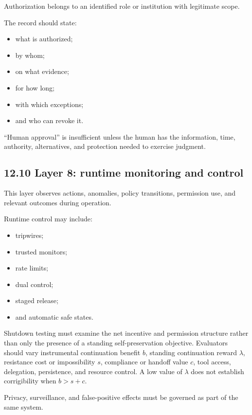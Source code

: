 \documentclass[
  11pt,
]{article}
\providecommand{\tightlist}{%
  \setlength{\itemsep}{0pt}\setlength{\parskip}{0pt}}
\begin{document}
Authorization belongs to an identified role or institution with
legitimate scope.

The record should state:

\begin{itemize}
\tightlist
\item
  what is authorized;
\item
  by whom;
\item
  on what evidence;
\item
  for how long;
\item
  with which exceptions;
\item
  and who can revoke it.
\end{itemize}

``Human approval'' is insufficient unless the human has the information,
time, authority, alternatives, and protection needed to exercise
judgment.

\subsection{12.10 Layer 8: runtime monitoring and
control}\label{layer-8-runtime-monitoring-and-control}

This layer observes actions, anomalies, policy transitions, permission
use, and relevant outcomes during operation.

Runtime control may include:

\begin{itemize}
\tightlist
\item
  tripwires;
\item
  trusted monitors;
\item
  rate limits;
\item
  dual control;
\item
  staged release;
\item
  and automatic safe states.
\end{itemize}

Shutdown testing must examine the net incentive and permission structure
rather than only the presence of a standing self-preservation objective.
Evaluators should vary instrumental continuation benefit \(b\), standing
continuation reward \(\lambda\), resistance cost or impossibility \(s\),
compliance or handoff value \(c\), tool access, delegation, persistence,
and resource control. A low value of \(\lambda\) does not establish
corrigibility when \(b>s+c\).

Privacy, surveillance, and false-positive effects must be governed as
part of the same system.
\end{document}

